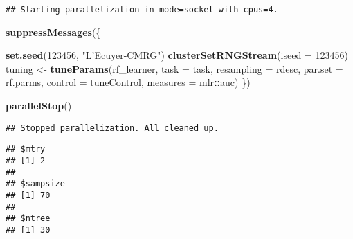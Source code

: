 \documentclass[
]{article}
\newenvironment{Shaded}{\begin{snugshade}}{\end{snugshade}}
\newcommand{\DataTypeTok}[1]{\textcolor[rgb]{0.13,0.29,0.53}{#1}}
\newcommand{\DecValTok}[1]{\textcolor[rgb]{0.00,0.00,0.81}{#1}}
\newcommand{\KeywordTok}[1]{\textcolor[rgb]{0.13,0.29,0.53}{\textbf{#1}}}
\newcommand{\NormalTok}[1]{#1}
\newcommand{\OperatorTok}[1]{\textcolor[rgb]{0.81,0.36,0.00}{\textbf{#1}}}
\newcommand{\OtherTok}[1]{\textcolor[rgb]{0.56,0.35,0.01}{#1}}
\newcommand{\StringTok}[1]{\textcolor[rgb]{0.31,0.60,0.02}{#1}}
\begin{document}
\begin{verbatim}
## Starting parallelization in mode=socket with cpus=4.
\end{verbatim}

\begin{Shaded}
\begin{Highlighting}[]
\KeywordTok{suppressMessages}\NormalTok{(\{}

  \KeywordTok{set.seed}\NormalTok{(}\DecValTok{123456}\NormalTok{, }\StringTok{"L'Ecuyer-CMRG"}\NormalTok{)}
  \KeywordTok{clusterSetRNGStream}\NormalTok{(}\DataTypeTok{iseed =} \DecValTok{123456}\NormalTok{)}
\NormalTok{  tuning <-}\StringTok{ }\KeywordTok{tuneParams}\NormalTok{(rf_learner, }\DataTypeTok{task =}\NormalTok{ task, }\DataTypeTok{resampling =}\NormalTok{ rdesc,}
                     \DataTypeTok{par.set =}\NormalTok{ rf.parms, }\DataTypeTok{control =}\NormalTok{ tuneControl, }\DataTypeTok{measures =}\NormalTok{ mlr}\OperatorTok{::}\NormalTok{auc)}
\NormalTok{\})}


\KeywordTok{parallelStop}\NormalTok{()}
\end{Highlighting}
\end{Shaded}

\begin{verbatim}
## Stopped parallelization. All cleaned up.
\end{verbatim}

\begin{Shaded}
\end{Shaded}

\begin{verbatim}
## $mtry
## [1] 2
## 
## $sampsize
## [1] 70
## 
## $ntree
## [1] 30
\end{verbatim}

\begin{Shaded}
\end{Shaded}
\end{document}
